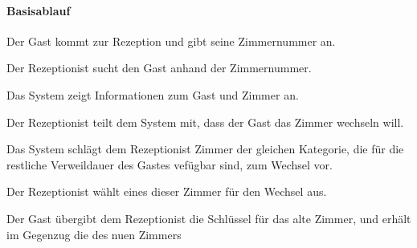 \paragraph{Basisablauf}
\begin{longenum}
	\item Der \Gls{Gast} kommt zur \Gls{Rezeption} und gibt seine Zimmernummer an.
	\item Der \Gls{Rezeptionist} sucht den Gast anhand der Zimmernummer.
	\item Das System zeigt Informationen zum \Gls{Gast} und \Gls{Zimmer} an.
	\item Der \Gls{Rezeptionist} teilt dem System mit, dass der \Gls{Gast} das \Gls{Zimmer} wechseln will.
	\item Das System schlägt dem \Gls{Rezeptionist} \Gls{Zimmer} der gleichen Kategorie, die für die restliche Verweildauer des \Gls{Gast}es vefügbar sind, zum Wechsel vor.
	\item Der \Gls{Rezeptionist} wählt eines dieser Zimmer für den Wechsel aus.
	\item Der \Gls{Gast} übergibt dem \Gls{Rezeptionist} die Schlüssel für das alte Zimmer, und erhält im Gegenzug die des nuen Zimmers
\end{longenum}

